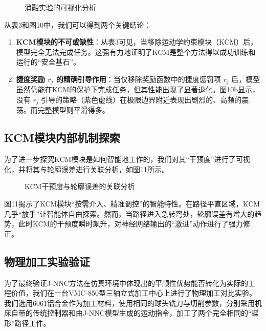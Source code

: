 \documentclass[preprint,12pt]{elsarticle}
\begin{document}
\begin{figure}[htbp]
    \centering
    \caption{消融实验的可视化分析}
    \label{fig:ablation_vis}
\end{figure}

从表3和图10中，我们可以得到两个关键结论：
\begin{enumerate}
    \item \textbf{KCM模块的不可或缺性}：从表3可见，当移除运动学约束模块（KCM）后，模型完全无法完成任务。这强有力地证明了KCM是整个方法得以成功训练和运行的“安全基石”。
    \item \textbf{捷度奖励 $r_j$ 的精确引导作用}：当仅移除奖励函数中的捷度惩罚项 $r_j$ 后，模型虽然仍能在KCM的保护下完成任务，但其性能出现了显著退化。图10b显示，没有 $r_j$ 引导的策略（紫色虚线）在极限边界附近表现出剧烈的、高频的震荡。而完整模型则平滑得多。
\end{enumerate}

\subsection{KCM模块内部机制探索}
为了进一步探究KCM模块是如何智能地工作的，我们对其“干预度”进行了可视化，并将其与轮廓误差进行关联分析，如图11所示。

\begin{figure}[htbp]
    \centering
    \caption{KCM干预度与轮廓误差的关联分析}
    \label{fig:kcm_analysis}
\end{figure}

图11揭示了KCM模块“按需介入、精准调控”的智能特性。在路径平直区域，KCM几乎“放手”让智能体自由探索。然而，当路径进入急转弯处，轮廓误差有增大的趋势，此时KCM的干预度瞬时飙升，对神经网络输出的“激进”动作进行了强力修正。

\subsection{物理加工实验验证}
为了最终验证J-NNC方法在仿真环境中体现出的平顺性优势能否转化为实际的工程价值，我们在一台VMC-850型三轴立式加工中心上进行了物理加工对比实验。我们选用6061铝合金作为加工材料，使用相同的球头铣刀与切削参数，分别采用机床自带的传统控制器和由J-NNC模型生成的运动指令，加工了两个完全相同的“蝶形”路径工件。
\end{document}
